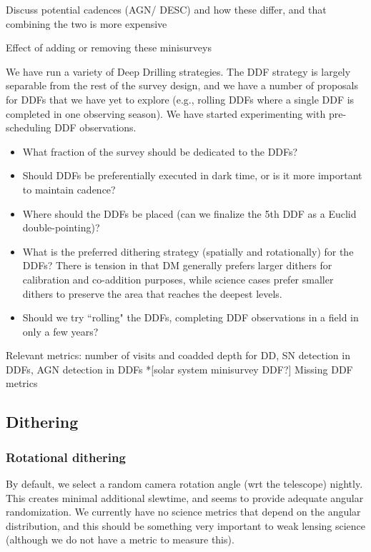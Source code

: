 Discuss potential cadences (AGN/ DESC) and how these differ, and that combining the two is more expensive

Effect of adding or removing these minisurveys

We have run a variety of Deep Drilling strategies. The DDF strategy is largely separable from the rest of the survey design, and we have a number of proposals for DDFs that we have yet to explore (e.g., rolling DDFs where a single DDF is completed in one observing season).  We have started experimenting with pre-scheduling DDF observations. 

\begin{itemize}
    \item{What fraction of the survey should be dedicated to the DDFs?}
    \item{Should DDFs be preferentially executed in dark time, or is it more important to maintain cadence?}
    \item{Where should the DDFs be placed (can we finalize the 5th DDF as a Euclid double-pointing)?}
    \item{What is the preferred dithering strategy (spatially and rotationally) for the DDFs? There is tension in that DM generally prefers larger dithers for calibration and co-addition purposes, while science cases prefer smaller dithers to preserve the area that reaches the deepest levels.}
    \item{Should we try ``rolling" the DDFs, completing DDF observations in a field in only a few years?}
\end{itemize}

Relevant metrics: number of visits and coadded depth for DD, SN detection in DDFs, AGN detection in DDFs
*[solar system minisurvey DDF?]
Missing DDF metrics

\subsection{Dithering}

\subsubsection{Rotational dithering}

By default, we select a random camera rotation angle (wrt the telescope) nightly. This creates minimal additional slewtime, and seems to provide adequate angular randomization.  We currently have no science metrics that depend on the angular distribution, and this should be something very important to weak lensing science (although we do not have a metric to measure this).

